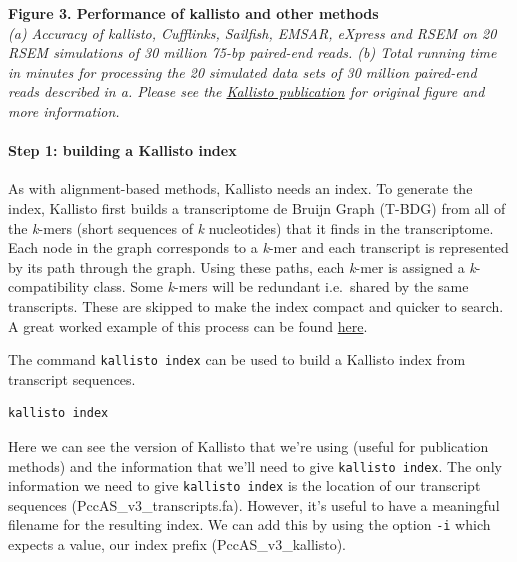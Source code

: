 \documentclass[11pt]{article}
\makeatletter
\newcommand{\boxspacing}{\kern\kvtcb@left@rule\kern\kvtcb@boxsep}
\newcommand{\prompt}[4]{
        \ttfamily\llap{{\color{#2}[#3]:\hspace{3pt}#4}}\vspace{-\baselineskip}
    }
\makeatother
\begin{document}
    \textbf{Figure 3. Performance of kallisto and other methods}\\
\textit{(a) Accuracy of kallisto, Cufflinks, Sailfish, EMSAR, eXpress and
RSEM on 20 RSEM simulations of 30 million 75-bp paired-end reads. (b)
Total running time in minutes for processing the 20 simulated data sets
of 30 million paired-end reads described in a. Please see the
\href{https://www.nature.com/articles/nbt.3519}{Kallisto publication}
for original figure and more information.}

\newpage

    \hypertarget{step-1-building-a-kallisto-index}{%
\paragraph{Step 1: building a Kallisto
index}\label{step-1-building-a-kallisto-index}}

As with alignment-based methods, Kallisto needs an index. To generate
the index, Kallisto first builds a transcriptome de Bruijn Graph (T-BDG)
from all of the \textit{k}-mers (short sequences of \textit{k} nucleotides)
that it finds in the transcriptome. Each node in the graph corresponds
to a \textit{k}-mer and each transcript is represented by its path through
the graph. Using these paths, each \textit{k}-mer is assigned a
\textit{k}-compatibility class. Some \textit{k}-mers will be redundant
i.e.~shared by the same transcripts. These are skipped to make the index
compact and quicker to search. A great worked example of this process
can be found
\href{http://bioinfo.iric.ca/understanding-how-kallisto-works/}{here}.

The command \texttt{kallisto\ index} can be used to build a Kallisto
index from transcript sequences.

    \begin{tcolorbox}[breakable, size=fbox, boxrule=1pt, pad at break*=1mm,colback=cellbackground, colframe=cellborder]
\prompt{In}{incolor}{ }{\boxspacing}
\begin{Verbatim}[commandchars=\\\{\}]
kallisto index
\end{Verbatim}
\end{tcolorbox}

    Here we can see the version of Kallisto that we're using (useful for
publication methods) and the information that we'll need to give
\texttt{kallisto\ index}. The only information we need to give
\texttt{kallisto\ index} is the location of our transcript sequences
(PccAS\_v3\_transcripts.fa). However, it's useful to have a meaningful
filename for the resulting index. We can add this by using the option
\texttt{-i} which expects a value, our index prefix
(PccAS\_v3\_kallisto).
\end{document}
